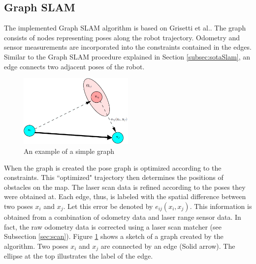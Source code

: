 \documentclass{ba-kecs}
\begin{document}
\subsection{Graph SLAM}
\label{sec:implSLAM}
The implemented Graph SLAM algorithm is based on Grisetti et al.\citep{Grisetti}. The graph consists of nodes representing poses along the robot trajectory. Odometry and sensor measurements are incorporated into the constraints contained in the edges. Similar to the Graph SLAM procedure explained in Section \ref{subsec:sotaSlam}, an edge connects two adjacent poses of the robot. 
\begin{figure}[h]
	\centering
		\includegraphics[width=0.50\textwidth]{figures/graph.png}
	\caption{An example of a simple graph \citep{Grisetti}}
	\label{fig:turtlebotexample_graph}
\end{figure}
When the graph is created the pose graph is optimized according to the constraints. This ``optimized" trajectory then determines the positions of obstacles on the map. The laser scan data is refined according to the poses they were obtained at. Each edge, thus, is labeled with the spatial difference between two poses \(x_i\) and \(x_j\). Let this error be denoted by \(e_{ij}(x_i, x_j)\). This information is obtained from a combination of odometry data and laser range sensor data. In fact, the raw odometry data is corrected using a laser scan matcher (see Subsection \ref{sec:scan}). 
Figure \ref{fig:turtlebotexample_graph} shows a sketch of a graph created by the algorithm. Two poses \(x_i\) and \(x_j\) are connected by an edge (Solid arrow). The ellipse at the top illustrates the label of the edge.
\end{document}
